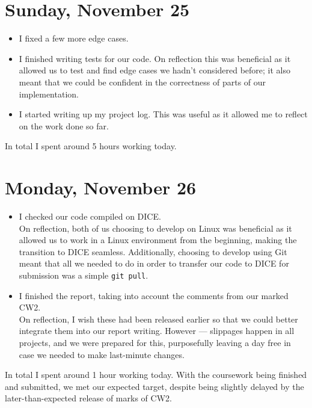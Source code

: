 \documentclass[titlepage, 12pt]{extarticle}
\begin{document}
\section{Sunday, November 25}
\begin{itemize}
  \item I fixed a few more edge cases.
  \item I finished writing tests for our code. On reflection this was beneficial as it allowed us to test and find edge cases we hadn't considered before; it also meant that we could be confident in the correctness of parts of our implementation.
  \item I started writing up my project log. This was useful as it allowed me to reflect on the work done so far. 
\end{itemize}
In total I spent around 5 hours working today.

\section{Monday, November 26}
\begin{itemize}
\item I checked our code compiled on DICE. \\ On reflection, both of us choosing to develop on Linux was beneficial as it allowed us to work in a Linux environment from the beginning, making the transition to DICE seamless. Additionally, choosing to develop using Git meant that all we needed to do in order to transfer our code to DICE for submission was a simple {\tt git pull}.
\item I finished the report, taking into account the comments from our marked CW2. \\ On reflection, I wish these had been released earlier so that we could better integrate them into our report writing. However --- slippages happen in all projects, and we were prepared for this, purposefully leaving a day free in case we needed to make last-minute changes. 
\end{itemize}
In total I spent around 1 hour working today. With the coursework being finished and submitted, we met our expected target, despite being slightly delayed by the later-than-expected release of marks of CW2.
\end{document}
